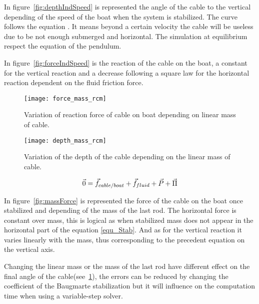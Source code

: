 In figure~\ref{fig:depthIndSpeed} is represented the angle of the cable to the vertical depending of the speed of the boat when the system is stabilized. The curve follows the equation \label{equ_theta_1}.
It means beyond a certain velocity the cable will be useless due to be not enough submerged and horizontal. The simulation at equilibrium respect the equation of the pendulum.

In figure~\ref{fig:forceIndSpeed} is the reaction of the cable on the boat, a constant for the vertical reaction and a decrease following a square law for the horizontal reaction dependent on the fluid friction force.


\begin{figure}[H]
\centering
    \begin{minipage}[b]{0.4\textwidth}
    \centering
    \texttt{[image: force\_mass\_rcm]}
    \caption{Variation of reaction force of cable on boat depending on linear  mass of cable.}
    \label{fig:massForce}
    \end{minipage}
    \hfill
    \begin{minipage}[b]{0.45\textwidth}
    \centering
    \texttt{[image: depth\_mass\_rcm]}
    \caption{Variation of the depth of the cable depending on the linear mass of cable.}
    \label{fig:linmassAngle}
    \end{minipage}
\end{figure}

\begin{equation}
 \vec{0} = \vec{f}_{cable/boat}+\vec{f}_{fluid}+\vec{P}+\vec{\Pi}\\
 \label{equ_Stab}
\end{equation}

In figure~\ref{fig:massForce} is represented the force of the cable on the boat once stabilized and depending of the mass of the last rod. The horizontal force is constant over mass, this is logical as when stabilized mass does not appear in the horizontal part of the equation \eqref{equ_Stab}. And as for the vertical reaction it varies linearly with the mass, thus corresponding to the precedent equation on the vertical axis.

Changing the linear mass or the mass of the last rod have different effect on the final angle of the cable(see~\ref{fig:linmassAngle}), the errors can be reduced by changing the coefficient of the Baugmarte stabilization but it will influence on the computation time when using a variable-step solver.

